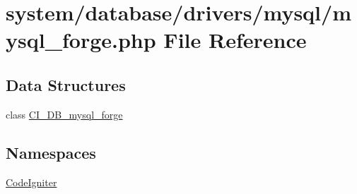 \hypertarget{mysql__forge_8php}{}\section{system/database/drivers/mysql/mysql\+\_\+forge.php File Reference}
\label{mysql__forge_8php}
\subsection*{Data Structures}
\begin{DoxyCompactItemize}
\item 
class \mbox{\hyperlink{class_c_i___d_b__mysql__forge}{C\+I\+\_\+\+D\+B\+\_\+mysql\+\_\+forge}}
\end{DoxyCompactItemize}
\subsection*{Namespaces}
\begin{DoxyCompactItemize}
\item 
 \mbox{\hyperlink{namespace_code_igniter}{Code\+Igniter}}
\end{DoxyCompactItemize}
